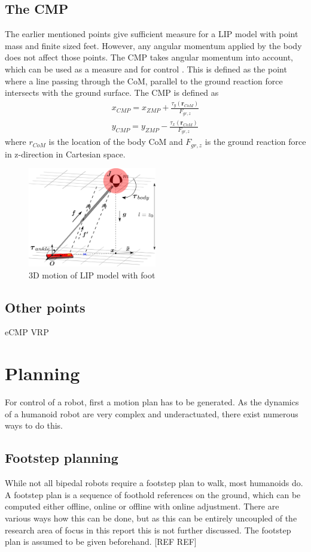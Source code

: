 \subsection{The \ac{CMP}}
The earlier mentioned points give sufficient measure for a \ac{LIP} model with point mass and finite sized feet. However, any angular momentum applied by the body does not affect those points. The \ac{CMP} takes angular momentum into account, which can be used as a measure and for control \cite{popovic2005ground}. This is defined as the point where a line passing through the \ac{CoM}, parallel to the ground reaction force intersects with the ground surface. The \ac{CMP} is defined as
\begin{eqnarray}
x_{CMP} = x_{ZMP} + \frac{\tau_y(\boldsymbol{r}_{CoM})}{F_{gr,z}}\\
y_{CMP} = y_{ZMP} - \frac{\tau_x(\boldsymbol{r}_{CoM})}{F_{gr,z}}
\end{eqnarray}
where $r_{CoM}$ is the location of the body \ac{CoM} and $F_{gr,z}$ is the ground reaction force in z-direction in Cartesian space. 
\begin{figure}[h]
\centering
\includegraphics[width=0.5\textwidth]{STYLESTUFF/3DCoMwithfootinertia.png}
\caption{\ac{3D} motion of \ac{LIP} model with foot}
\label{fig:3dlipfoot}
\end{figure}
\subsection{Other points}
\ac{eCMP} \ac{VRP}
\section{Planning}
For control of a robot, first a motion plan has to be generated. As the dynamics of a humanoid robot are very complex and underactuated, there exist numerous ways to do this. 
\subsection{Footstep planning}
While not all bipedal robots require a footstep plan to walk, most humanoids do. A footstep plan is a sequence of foothold references on the ground, which can be computed either offline, online or offline with online adjustment. There are various ways how this can be done, but as this can be entirely uncoupled of the research area of focus in this report this is not further discussed. The footstep plan is assumed to be given beforehand. [REF REF]

